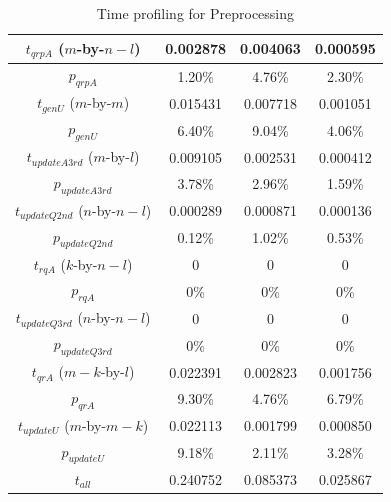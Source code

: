 \begin{table}[H]
{\begin{tabular}{||c | c | c | c ||}
          $t_{qrpA}$ ($m$-by-$n-l$) & 0.002878 & 0.004063 & 0.000595 \\ [0.5ex] \hline
          $p_{qrpA}$ & 1.20\% & 4.76\% & 2.30\% \\ [0.5ex] \hline
          $t_{genU}$ ($m$-by-$m$) & 0.015431 & 0.007718 & 0.001051 \\ [0.5ex]\hline
          $p_{genU}$ & 6.40\% & 9.04\% & 4.06\% \\ [0.5ex]\hline
          $t_{updateA3rd}$ ($m$-by-$l$)& 0.009105 & 0.002531 & 0.000412 \\ [0.5ex]\hline
          $p_{updateA3rd}$ & 3.78\% & 2.96\% & 1.59\% \\ [0.5ex]\hline
          $t_{updateQ2nd}$ ($n$-by-$n-l$)& 0.000289 & 0.000871 & 0.000136 \\ [0.5ex]\hline
          $p_{updateQ2nd}$ & 0.12\% & 1.02\% & 0.53\% \\ [0.5ex]\hline
          \hline
         
          $t_{rqA}$ ($k$-by-$n-l$) & 0 & 0 & 0 \\ [0.5ex] \hline
          $p_{rqA}$ & 0\% & 0\% & 0\% \\ [0.5ex] \hline
          $t_{updateQ3rd}$ ($n$-by-$n-l$)& 0 & 0 & 0 \\ [0.5ex]\hline
          $p_{updateQ3rd}$ & 0\% & 0\% & 0\% \\ [0.5ex]
          \hline\hline
          
          $t_{qrA}$ ($m-k$-by-$l$) & 0.022391 & 0.002823 & 0.001756 \\ [0.5ex] \hline
          $p_{qrA}$ & 9.30\% & 4.76\% & 6.79\% \\ [0.5ex] \hline
          $t_{updateU}$ ($m$-by-$m-k$)& 0.022113 & 0.001799 & 0.000850 \\ [0.5ex]\hline
          $p_{updateU}$ & 9.18\% & 2.11\% & 3.28\% \\ [0.5ex]
          \hline\hline
          $t_{all}$ & 0.240752 & 0.085373 & 0.025867 \\[0.5ex]
          \hline
        \end{tabular}
        }
        \caption{Time profiling for Preprocessing}
    \label{table:3}
    \end{table}
